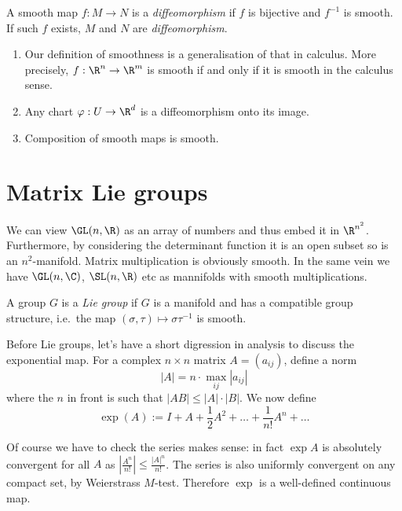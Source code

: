 \documentclass[a4paper]{article}
\begin{document}
\begin{definition}[diffeomorphism]
  A smooth map \(f: M \to N\) is a \emph{diffeomorphism} if \(f\) is bijective and \(f^{-1}\) is smooth. If such \(f\) exists, \(M\) and \(N\) are \emph{diffeomorphism}.
\end{definition}

\begin{remark}\leavevmode
\begin{enumerate}
\item Our definition of smoothness is a generalisation of that in calculus. More precisely, \(f: \R^n \to \R^m\) is smooth if and only if it is smooth in the calculus sense.
\item Any chart \(\varphi: U \to \R^d\) is a diffeomorphism onto its image.
\item Composition of smooth maps is smooth.
\end{enumerate}
\end{remark}

\section{Matrix Lie groups}

We can view \(\GL(n, \R)\) as an array of numbers and thus embed it in \(\R^{n^2}\). Furthermore, by considering the determinant function it is an open subset so is an \(n^2\)-manifold. Matrix multiplication is obviously smooth. In the same vein we have \(\GL(n, \C)\), \(\SL(n, \R)\) etc as mannifolds with smooth multiplications.

\begin{definition}
  A group \(G\) is a \emph{Lie group} if \(G\) is a manifold and has a compatible group structure, i.e.\ the map \((\sigma, \tau) \mapsto \sigma\tau^{-1}\) is smooth.
\end{definition}

Before Lie groups, let's have a short digression in analysis to discuss the exponential map. For a complex \(n \times n\) matrix \(A = (a_{ij})\), define a norm
\[
  |A| = n \cdot \max_{ij} |a_{ij}|
\]
where the \(n\) in front is such that \(|AB| \leq |A| \cdot |B|\). We now define
\[
  \exp(A) := I + A + \frac{1}{2} A^2 + \dots + \frac{1}{n!} A^n + \dots
\]

Of course we have to check the series makes sense: in fact \(\exp A\) is absolutely convergent for all \(A\) as \(\left| \frac{A^n}{n!} \right| \leq \frac{|A|^n}{n!}\). The series is also uniformly convergent on any compact set, by Weierstrass \(M\)-test. Therefore \(\exp\) is a well-defined continuous map.
\end{document}
